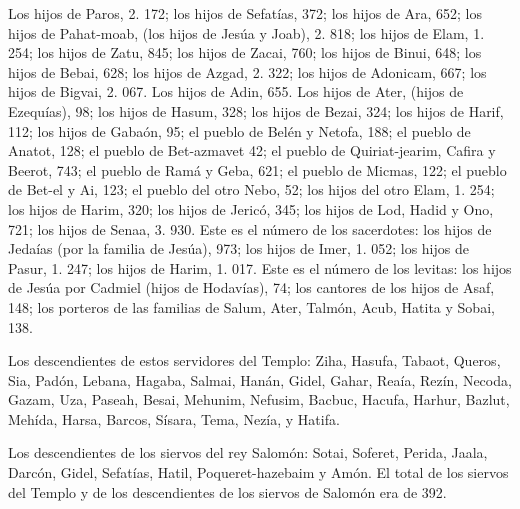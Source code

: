  Los hijos de Paros, 2. 172;  los hijos de
Sefatías, 372;  los hijos de Ara, 652; 
los hijos de Pahat-moab, (los hijos de Jesúa y Joab), 2. 818;
 los hijos de Elam, 1. 254;  los hijos de
Zatu, 845;  los hijos de Zacai, 760;  los
hijos de Binui, 648;  los hijos de Bebai, 628;
 los hijos de Azgad, 2. 322;  los hijos de
Adonicam, 667;  los hijos de Bigvai, 2. 067.
 Los hijos de Adin, 655.  Los hijos de
Ater, (hijos de Ezequías), 98;  los hijos de Hasum, 328;
 los hijos de Bezai, 324;  los hijos de
Harif, 112;  los hijos de Gabaón, 95;  el
pueblo de Belén y Netofa, 188;  el pueblo de Anatot, 128;
 el pueblo de Bet-azmavet 42;  el pueblo
de Quiriat-jearim, Cafira y Beerot, 743;  el pueblo de
Ramá y Geba, 621;  el pueblo de Micmas, 122;
 el pueblo de Bet-el y Ai, 123;  el pueblo
del otro Nebo, 52;  los hijos del otro Elam, 1. 254;
 los hijos de Harim, 320;  los hijos de
Jericó, 345;  los hijos de Lod, Hadid y Ono, 721;
 los hijos de Senaa, 3. 930.  Este es el
número de los sacerdotes: los hijos de Jedaías (por la familia de
Jesúa), 973;  los hijos de Imer, 1. 052; 
los hijos de Pasur, 1. 247;  los hijos de Harim, 1. 017.
 Este es el número de los levitas: los hijos de Jesúa por
Cadmiel (hijos de Hodavías), 74;  los cantores de los
hijos de Asaf, 148;  los porteros de las familias de
Salum, Ater, Talmón, Acub, Hatita y Sobai, 138.

 Los descendientes de estos servidores del Templo: Ziha,
Hasufa, Tabaot,  Queros, Sia, Padón, 
Lebana, Hagaba, Salmai,  Hanán, Gidel, Gahar,
 Reaía, Rezín, Necoda,  Gazam, Uza,
Paseah,  Besai, Mehunim, Nefusim,  Bacbuc,
Hacufa, Harhur,  Bazlut, Mehída, Harsa, 
Barcos, Sísara, Tema,  Nezía, y Hatifa.

 Los descendientes de los siervos del rey Salomón: Sotai,
Soferet, Perida,  Jaala, Darcón, Gidel, 
Sefatías, Hatil, Poqueret-hazebaim y Amón.  El total de
los siervos del Templo y de los descendientes de los siervos de Salomón
era de 392.

